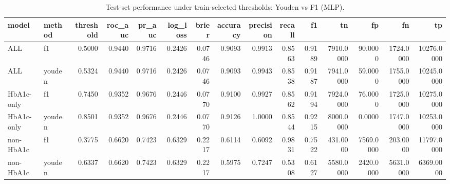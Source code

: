 \begin{table}[H]
\begin{center}
\begin{tabular}{llrrrrrrrrrrrrr}
\toprule
model & method & threshold & roc_auc & pr_auc & log_loss & brier & accuracy & precision & recall & f1 & tn & fp & fn & tp \\
\midrule
ALL & f1 & 0.5000 & 0.9440 & 0.9716 & 0.2426 & 0.0746 & 0.9093 & 0.9913 & 0.8563 & 0.9189 & 7910.0000 & 90.0000 & 1724.0000 & 10276.0000 \\
ALL & youden & 0.5324 & 0.9440 & 0.9716 & 0.2426 & 0.0746 & 0.9093 & 0.9943 & 0.8538 & 0.9187 & 7941.0000 & 59.0000 & 1755.0000 & 10245.0000 \\
HbA1c-only & f1 & 0.7450 & 0.9352 & 0.9676 & 0.2446 & 0.0770 & 0.9100 & 0.9927 & 0.8562 & 0.9194 & 7924.0000 & 76.0000 & 1725.0000 & 10275.0000 \\
HbA1c-only & youden & 0.8501 & 0.9352 & 0.9676 & 0.2446 & 0.0770 & 0.9126 & 1.0000 & 0.8544 & 0.9215 & 8000.0000 & 0.0000 & 1747.0000 & 10253.0000 \\
non-HbA1c & f1 & 0.3775 & 0.6620 & 0.7423 & 0.6329 & 0.2217 & 0.6114 & 0.6092 & 0.9831 & 0.7522 & 431.0000 & 7569.0000 & 203.0000 & 11797.0000 \\
non-HbA1c & youden & 0.6337 & 0.6620 & 0.7423 & 0.6329 & 0.2217 & 0.5975 & 0.7247 & 0.5308 & 0.6127 & 5580.0000 & 2420.0000 & 5631.0000 & 6369.0000 \\
\bottomrule
\end{tabular}
\end{center}
\vspace{-5pt}
\caption{Test-set performance under train-selected thresholds: Youden vs F1 (MLP).}
\label{tab:mlp_test_threshold_rule_comparison}
\end{table}
